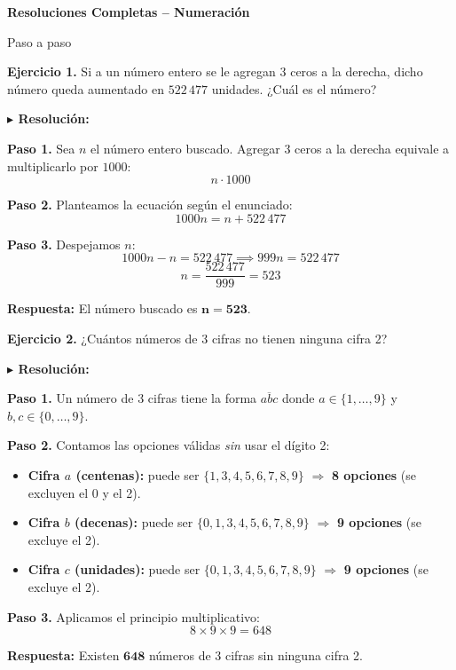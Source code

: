 \documentclass[10pt]{article}
\newcommand{\ejercicio}[2]{%
  \begin{enuncbox}
    \textbf{\textcolor{enunciado}{Ejercicio #1.}} #2
  \end{enuncbox}
}
\newcommand{\resolucion}{\vspace{2pt}\textbf{\textcolor{resolucion}{$\blacktriangleright$ Resolución:}}\vspace{4pt}}
\newcommand{\respuesta}[1]{%
  \begin{respbox}
    \textbf{\textcolor{respuesta}{Respuesta:}} #1
  \end{respbox}
}
\begin{document}
\begin{center}
    \Large\bfseries Resoluciones Completas -- Numeración
\end{center}
\begin{center}
    \large Paso a paso
\end{center}

\vspace{0.3cm}

\ejercicio{1}{Si a un número entero se le agregan 3 ceros a la derecha, dicho número queda aumentado en $522\,477$ unidades. ¿Cuál es el número?}

\resolucion

\textbf{Paso 1.} Sea $n$ el número entero buscado. Agregar 3 ceros a la derecha equivale a multiplicarlo por $1000$:
\[
    n \cdot 1000
\]

\textbf{Paso 2.} Planteamos la ecuación según el enunciado:
\[
    1000n = n + 522\,477
\]

\textbf{Paso 3.} Despejamos $n$:
\[
    1000n - n = 522\,477 \implies 999n = 522\,477
\]
\[
    n = \frac{522\,477}{999} = 523
\]

\respuesta{El número buscado es $\mathbf{n = 523}$.}

\ejercicio{2}{¿Cuántos números de 3 cifras no tienen ninguna cifra 2?}

\resolucion

\textbf{Paso 1.} Un número de 3 cifras tiene la forma $\overline{abc}$ donde $a \in \{1,\ldots,9\}$ y $b,c \in \{0,\ldots,9\}$.

\textbf{Paso 2.} Contamos las opciones válidas \emph{sin} usar el dígito 2:
\begin{itemize}[itemsep=2pt]
    \item \textbf{Cifra $a$ (centenas):} puede ser $\{1,3,4,5,6,7,8,9\}$ $\Rightarrow$ \textbf{8 opciones} (se excluyen el 0 y el 2).
    \item \textbf{Cifra $b$ (decenas):} puede ser $\{0,1,3,4,5,6,7,8,9\}$ $\Rightarrow$ \textbf{9 opciones} (se excluye el 2).
    \item \textbf{Cifra $c$ (unidades):} puede ser $\{0,1,3,4,5,6,7,8,9\}$ $\Rightarrow$ \textbf{9 opciones} (se excluye el 2).
\end{itemize}

\textbf{Paso 3.} Aplicamos el principio multiplicativo:
\[
    8 \times 9 \times 9 = 648
\]

\respuesta{Existen $\mathbf{648}$ números de 3 cifras sin ninguna cifra 2.}
\end{document}
